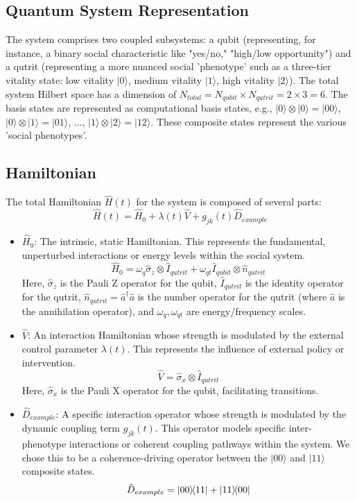 \documentclass[9pt]{article}
\begin{document}
\subsection{Quantum System Representation}
The system comprises two coupled subsystems: a qubit (representing, for instance, a binary social characteristic like "yes/no," "high/low opportunity") and a qutrit (representing a more nuanced social 'phenotype' such as a three-tier vitality state: low vitality $|0\rangle$, medium vitality $|1\rangle$, high vitality $|2\rangle$). The total system Hilbert space has a dimension of $N_{total} = N_{qubit} \times N_{qutrit} = 2 \times 3 = 6$. The basis states are represented as computational basis states, e.g., $|0\rangle \otimes |0\rangle = |00\rangle$, $|0\rangle \otimes |1\rangle = |01\rangle$, ..., $|1\rangle \otimes |2\rangle = |12\rangle$. These composite states represent the various 'social phenotypes'.

\subsection{Hamiltonian}
The total Hamiltonian $\hat{H}(t)$ for the system is composed of several parts:
$$ \hat{H}(t) = \hat{H}_0 + \lambda(t) \hat{V} + g_{jk}(t) \hat{D}_{example} $$
\begin{itemize}
    \item $\hat{H}_0$: The intrinsic, static Hamiltonian. This represents the fundamental, unperturbed interactions or energy levels within the social system.
    $$ \hat{H}_0 = \omega_q \hat{\sigma}_z \otimes \hat{I}_{qutrit} + \omega_{qt} \hat{I}_{qubit} \otimes \hat{n}_{qutrit} $$
    Here, $\hat{\sigma}_z$ is the Pauli Z operator for the qubit, $\hat{I}_{qutrit}$ is the identity operator for the qutrit, $\hat{n}_{qutrit} = \hat{a}^\dagger \hat{a}$ is the number operator for the qutrit (where $\hat{a}$ is the annihilation operator), and $\omega_q, \omega_{qt}$ are energy/frequency scales.
    \item $\hat{V}$: An interaction Hamiltonian whose strength is modulated by the external control parameter $\lambda(t)$. This represents the influence of external policy or intervention.
    $$ \hat{V} = \hat{\sigma}_x \otimes \hat{I}_{qutrit} $$
    Here, $\hat{\sigma}_x$ is the Pauli X operator for the qubit, facilitating transitions.
    \item $\hat{D}_{example}$: A specific interaction operator whose strength is modulated by the dynamic coupling term $g_{jk}(t)$. This operator models specific inter-phenotype interactions or coherent coupling pathways within the system. We chose this to be a coherence-driving operator between the $|00\rangle$ and $|11\rangle$ composite states.
    $$ \hat{D}_{example} = \ketbra{00}{11} + \ketbra{11}{00} $$
\end{itemize}
\end{document}
